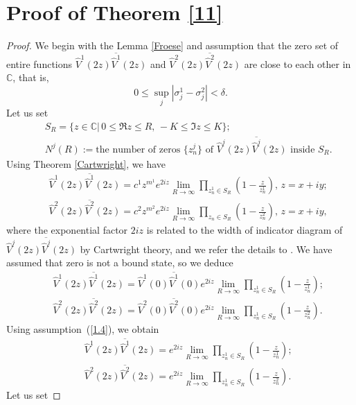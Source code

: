 \documentclass[10pt,a4paper]{article}
\theoremstyle{plain}
\theoremstyle{definition}
\theoremstyle{remark}
\numberwithin{equation}{section}
\begin{document}
\section{Proof of Theorem \ref{11}}
\begin{proof}
We begin with the Lemma \ref{Froese} and assumption that the zero set of entire functions $\hat{V}^{1}(2z)\overline{\hat{V}^{1}}(2z)$ and $\hat{V}^{2}(2z)\overline{\hat{V}^{2}}(2z)$ are close to each other in $\mathbb{C}$, that is,
$$0\leq\sup_{j}|\sigma_{j}^{1}-\sigma_{j}^{2}|<\delta.$$ 
Let us set
\begin{eqnarray*}
&&S_{R}=\{z\in\mathbb{C}|\,0\leq\Re z\leq R,\,-K\leq\Im z\leq K\};\\
&&N^{j}(R):=\mbox{the number of zeros }\{z_{n}^{j}\}\mbox{ of }\hat{V}^{j}(2z)\overline{\hat{V}^{j}}(2z)\mbox{ inside }S_{R}.
\end{eqnarray*}
Using Theorem \ref{Cartwright}, we have
\begin{eqnarray}
&&\hat{V}^{1}(2z)\overline{\hat{V}^{1}}(2z)=c^{1}z^{m^{1}}e^{2iz}\lim_{R\rightarrow \infty}\prod_{z^{1}_{n}\in S_{R}}(1-\frac{z}{z_{n}^{1}}),\,z=x+iy;\\
&&\hat{V}^{2}(2z)\overline{\hat{V}^{2}}(2z)=c^{2}z^{m^{2}}e^{2iz}\lim_{R\rightarrow \infty}\prod_{z_{n}\in S_{R}}(1-\frac{z}{z_{n}^{2}}),\,z=x+iy,
\end{eqnarray}
where the exponential factor $2iz$ is related to the width of indicator diagram of $\hat{V}^{j}(2z)\overline{\hat{V}^{j}}(2z)$ by Cartwright theory, and we refer the details to \cite[p.\,251]{Levin}.
We have assumed that zero is not a bound state, so we deduce
\begin{eqnarray}
&&\hat{V}^{1}(2z)\overline{\hat{V}^{1}}(2z)=\hat{V}^{1}(0)\overline{\hat{V}^{1}}(0)e^{2iz}\lim_{R\rightarrow \infty}\prod_{z^{1}_{n}\in S_{R}}(1-\frac{z}{z_{n}^{1}});\\
&&\hat{V}^{2}(2z)\overline{\hat{V}^{2}}(2z)=\hat{V}^{2}(0)\overline{\hat{V}^{2}}(0)e^{2iz}\lim_{R\rightarrow \infty}\prod_{z^{1}_{n}\in S_{R}}(1-\frac{z}{z_{n}^{2}}).
\end{eqnarray}
Using assumption~(\ref{1.4}), we obtain
\begin{eqnarray}
&&\hat{V}^{1}(2z)\overline{\hat{V}^{1}}(2z)=e^{2iz}\lim_{R\rightarrow  \infty}\prod_{z^{1}_{n}\in S_{R}}(1-\frac{z}{z_{n}^{1}});\\
&&\hat{V}^{2}(2z)\overline{\hat{V}^{2}}(2z)=e^{2iz}\lim_{R\rightarrow\infty}\prod_{z^{1}_{n}\in S_{R}}(1-\frac{z}{z_{n}^{2}}).
\end{eqnarray}
Let us set

\end{proof}
\end{document}
